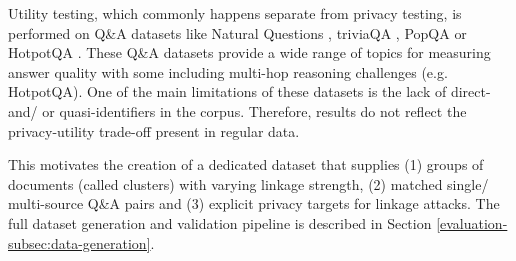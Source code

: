 Utility testing, which commonly happens separate from privacy testing, is performed on Q\&A datasets like Natural Questions \cite{NQ}, triviaQA \cite{TriviaQA}, PopQA \cite{popQA} or HotpotQA \cite{hotpotQA}. These Q\&A datasets provide a wide range of topics for measuring answer quality with some including multi-hop reasoning challenges (e.g. HotpotQA). One of the main limitations of these datasets is the lack of direct- and/ or quasi-identifiers in the corpus. Therefore, results do not reflect the privacy-utility trade-off present in regular data.

This motivates the creation of a dedicated dataset that supplies (1) groups of documents (called clusters) with varying linkage strength, (2) matched single/ multi-source Q\&A pairs and (3) explicit privacy targets for linkage attacks. The full dataset generation and validation pipeline is described in Section \ref{evaluation-subsec:data-generation}.
